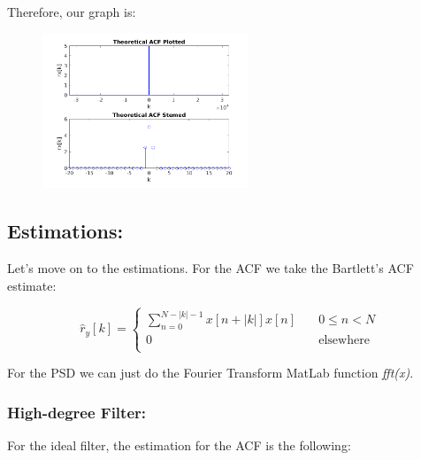 \documentclass[a4paper,11pt]{article}
\begin{document}
Therefore, our graph is:

\begin{figure}[!hp]
    \begin{center}
      \includegraphics[width=0.55\textwidth]{images/study1/r_ld_th.png}
    \end{center}
\end{figure}

\newpage

\subsection{Estimations:}

Let's move on to the estimations. For the ACF we take the Bartlett's ACF
estimate:

\begin{equation}\label{eq:Bartlett}
   \hat{r}_y[k] =
   \begin{cases}
       \displaystyle\sum_{n=0}^{N - |k| - 1} x[n + |k|] x[n] &\quad 0 \le n < N\\
       0 &\quad\text{elsewhere}\\
   \end{cases}
\end{equation}

For the PSD we can just do the Fourier Transform MatLab function \textit{fft(x)}.

\subsubsection{High-degree Filter:}

For the ideal filter, the estimation for the ACF is the following:
\end{document}
